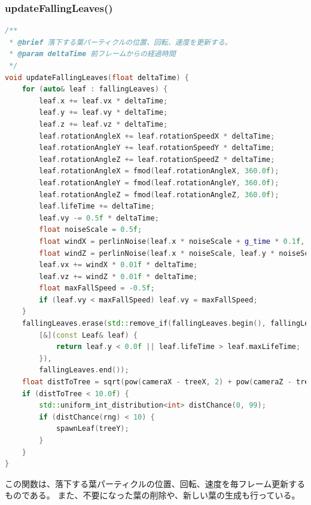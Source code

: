 \documentclass[uplatex,dvipdfmx,a4paper]{jsarticle}
\begin{document}
\hypertarget{func:updateFallingLeaves}{}\subsubsection{updateFallingLeaves()}\label{func:updateFallingLeaves}
\begin{lstlisting}[language=C++, caption={updateFallingLeaves() 関数}, label={lst:updateFallingLeaves_detail}]
/**
 * @brief 落下する葉パーティクルの位置、回転、速度を更新する。
 * @param deltaTime 前フレームからの経過時間
 */
void updateFallingLeaves(float deltaTime) {
    for (auto& leaf : fallingLeaves) {
        leaf.x += leaf.vx * deltaTime;
        leaf.y += leaf.vy * deltaTime;
        leaf.z += leaf.vz * deltaTime;
        leaf.rotationAngleX += leaf.rotationSpeedX * deltaTime;
        leaf.rotationAngleY += leaf.rotationSpeedY * deltaTime;
        leaf.rotationAngleZ += leaf.rotationSpeedZ * deltaTime;
        leaf.rotationAngleX = fmod(leaf.rotationAngleX, 360.0f);
        leaf.rotationAngleY = fmod(leaf.rotationAngleY, 360.0f);
        leaf.rotationAngleZ = fmod(leaf.rotationAngleZ, 360.0f);
        leaf.lifeTime += deltaTime;
        leaf.vy -= 0.5f * deltaTime;
        float noiseScale = 0.5f;
        float windX = perlinNoise(leaf.x * noiseScale + g_time * 0.1f, leaf.y * noiseScale, leaf.z * noiseScale) * 2.0f - 1.0f;
        float windZ = perlinNoise(leaf.x * noiseScale, leaf.y * noiseScale + g_time * 0.1f, leaf.z * noiseScale) * 2.0f - 1.0f;
        leaf.vx += windX * 0.01f * deltaTime;
        leaf.vz += windZ * 0.01f * deltaTime;
        float maxFallSpeed = -0.5f;
        if (leaf.vy < maxFallSpeed) leaf.vy = maxFallSpeed;
    }
    fallingLeaves.erase(std::remove_if(fallingLeaves.begin(), fallingLeaves.end(), 
        [&](const Leaf& leaf) {
            return leaf.y < 0.0f || leaf.lifeTime > leaf.maxLifeTime;
        }), 
        fallingLeaves.end());
    float distToTree = sqrt(pow(cameraX - treeX, 2) + pow(cameraZ - treeZ, 2));
    if (distToTree < 10.0f) {
        std::uniform_int_distribution<int> distChance(0, 99);
        if (distChance(rng) < 10) {
            spawnLeaf(treeY);
        }
    }
}
\end{lstlisting}
この関数は、落下する葉パーティクルの位置、回転、速度を毎フレーム更新するものである。
また、不要になった葉の削除や、新しい葉の生成も行っている。
\end{document}
